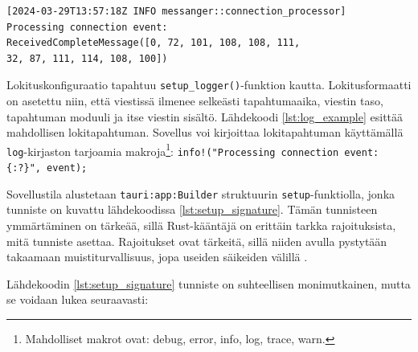 \documentclass[a4paper,12pt]{article}
\begin{document}
    \begin{lstlisting}[caption={Esimerkki lokitapahtumasta}, label={lst:log_example}]
[2024-03-29T13:57:18Z INFO messanger::connection_processor]
Processing connection event:
ReceivedCompleteMessage([0, 72, 101, 108, 108, 111,
32, 87, 111, 114, 108, 100])
    \end{lstlisting}


    Lokituskonfiguraatio tapahtuu \lstinline{setup_logger()}-funktion kautta.
    Lokitusformaatti on asetettu niin, että viestissä ilmenee selkeästi tapahtumaaika,
    viestin taso, tapahtuman moduuli ja itse viestin sisältö. Lähdekoodi \ref{lst:log_example} esittää mahdollisen lokitapahtuman. Sovellus voi kirjoittaa lokitapahtuman käyttämällä \lstinline{log}-kirjaston tarjoamia makroja\footnote{Mahdolliset makrot ovat: debug, error, info, log, trace, warn.}: \lstinline|info!("Processing connection event: {:?}", event);|\par



    Sovellustila alustetaan \lstinline{tauri:app:Builder} struktuurin \lstinline{setup}-funktiolla, jonka tunniste on kuvattu lähdekoodissa \ref{lst:setup_signature}. Tämän tunnisteen ymmärtäminen on tärkeää, sillä Rust-kääntäjä on erittäin tarkka rajoituksista, mitä tunniste asettaa. Rajoitukset ovat tärkeitä, sillä niiden avulla pystytään takaamaan muistiturvallisuus, jopa useiden säikeiden välillä \cite[ch. 8.2]{rust-book}. \par

    Lähdekoodin \ref{lst:setup_signature} tunniste on suhteellisen monimutkainen, mutta se voidaan lukea seuraavasti:
\end{document}
